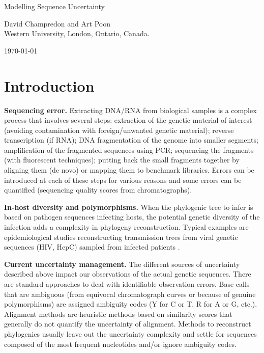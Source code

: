 \documentclass[10pt]{article}
\begin{document}
\Huge
\textsf{Modelling Sequence Uncertainty}

\large
\vspace{1cm}

David Champredon and Art Poon\\
\small
Western University, London, Ontario, Canada.

\vspace{1cm}
\normalsize
\begin{center}
\today
\end{center}


\linenumbers


\normalsize
\vspace{1cm}
\tableofcontents

\newpage

\section{Introduction}


\textbf{Sequencing error.} 
Extracting DNA/RNA from biological samples is a complex process that involves several steps: extraction of the genetic material of interest (avoiding contamination with foreign/unwanted genetic material); reverse transcription (if RNA); DNA fragmentation of the genome into smaller segments; amplification of the fragmented sequences using PCR; sequencing the fragments (\eg with fluorescent techniques); putting back the small fragments together by aligning them (de novo) or mapping them to benchmark libraries.
Errors can be introduced at each of these steps for various reasons \cite{Beerenwinkel:2011} and some errors can be quantified (\eg sequencing quality scores from chromatographs). 

\textbf{In-host diversity and polymorphisms.} 
When the phylogenic tree to infer is based on pathogen sequences infecting hosts, the potential genetic diversity of the infection adds a complexity in phylogeny reconstruction. Typical examples are epidemiological studies reconstructing transmission trees from viral genetic sequences (\eg HIV, HepC) sampled from infected patients . 


\textbf{Current uncertainty management.} 
The different sources of uncertainty described above impact our observations of the actual genetic sequences.
There are standard approaches to deal with identifiable observation errors. 
Base calls that are ambiguous (from equivocal chromatograph curves or because of genuine polymorphisms) are assigned ambiguity codes (\eg Y for C or T, R for A or G, etc.).
Alignment methods are heuristic methods based on similarity scores that generally do not quantify the uncertainty of alignment.
Methods to reconstruct phylogenies usually leave out the uncertainty complexity and settle for sequences composed of the most frequent nucleotides and/or ignore ambiguity codes.
\end{document}

